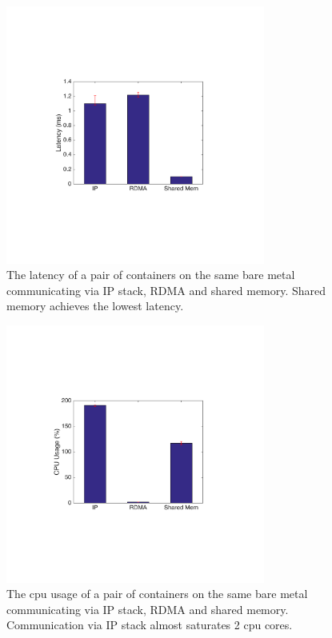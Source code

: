 \begin{figure}[!ht]
     \centering 
     \includegraphics[width=3.35in]{figures/motivation/eval_baremetal_latency.pdf} 
     \caption{\label{fig:eval_baremetal_latency} The latency of a pair of containers on the same bare metal communicating via IP stack, RDMA and shared memory. Shared memory achieves the lowest latency.} 
\end{figure} 


\begin{figure}[!ht]
     \centering 
     \includegraphics[width=3.35in]{figures/motivation/eval_baremetal_cpu.pdf} 
     \caption{\label{fig:eval_baremetal_cpu} The cpu usage of a pair of containers on the same bare metal communicating via IP stack, RDMA and shared memory. Communication via IP stack almost saturates 2 cpu cores.} 
\end{figure} 

\fi